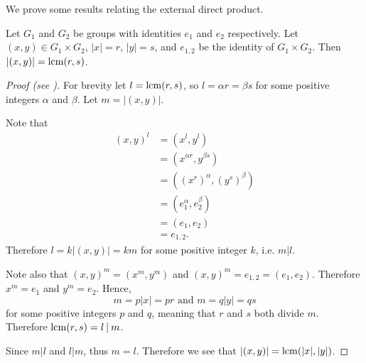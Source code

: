 We prove some results relating the external direct product.
\begin{proposition}\label{prop-order-of-element-in-external-direct-product}
    Let $G_1$ and $G_2$ be groups with identities $e_1$ and $e_2$ respectively. Let $(x, y) \in G_1 \times G_2$, $|x| = r$, $|y| = s$, and $e_{1,2}$ be the identity of $G_1\times G_2$. Then $|(x, y)| = \mathrm{lcm}(r, s)$.
\end{proposition}
\begin{proof}[Proof (see \cite{proofwiki_orderofgroupelementinexternaldirectproduct})]
    For brevity let $l = \mathrm{lcm}(r, s)$, so $l = \alpha r = \beta s$ for some positive integers $\alpha$ and $\beta$. Let $m = |(x, y)|$.

    Note that
    \begin{align*}
        (x, y)^l &= (x^l, y^l)\\
        &= (x^{\alpha r}, y^{\beta s})\\
        &= \left((x^r)^\alpha, (y^s)^\beta\right)\\
        &= (e_1^\alpha, e_2^\beta)\\
        &= (e_1, e_2)\\
        &= e_{1,2}.
    \end{align*}
    Therefore $l = k|(x, y)| = km$ for some positive integer $k$, i.e. $m\vert l$.

    Note also that $(x, y)^m = (x^m, y^m)$ and $(x, y)^m = e_{1,2} = (e_1, e_2)$. Therefore $x^m = e_1$ and $y^m = e_2$. Hence,
    \[
        m = p|x| = pr \text{ and } m = q|y| = qs
    \]
    for some positive integers $p$ and $q$, meaning that $r$ and $s$ both divide $m$. Therefore $\lcm(r, s) = l\vert m$.

    Since $m\vert l$ and $l\vert m$, thus $m = l$. Therefore we see that $|(x, y)| = \mathrm{lcm}(|x|, |y|)$.
\end{proof}

